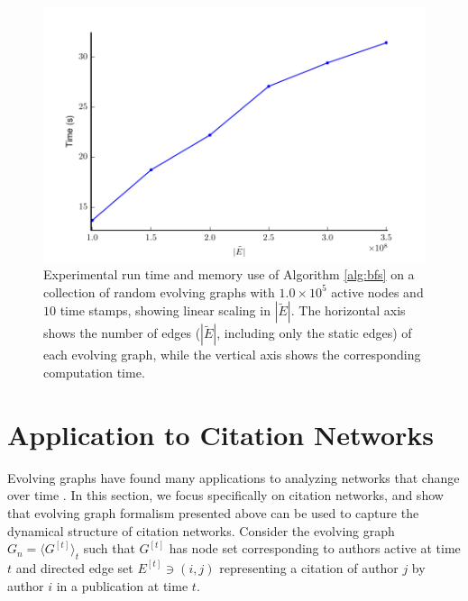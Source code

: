 \documentclass[10pt,conference,compsocconf]{IEEEtran}
\theoremstyle{definition}
\begin{document}
\begin{figure}[h]
  \centering
  \includegraphics[scale=0.58]{time.pdf}
  \caption{Experimental run time and memory use of Algorithm \ref{alg:bfs}
on a collection of random evolving graphs with $1.0\times 10^5$ active nodes and $10$ time
stamps, showing linear scaling in $|\tilde E|$. The horizontal axis shows the
number of edges ($|\tilde E|$, including only the static edges) of each evolving
graph, while the vertical axis shows the corresponding
computation time.}
  \label{fig:time}
\end{figure}

\section{Application to Citation Networks}
\label{sec:applications}

Evolving graphs have found many applications to analyzing networks that change
over time \cite{gphe11,grihig13}. In this section, we focus specifically on
citation networks, and show that evolving graph formalism presented above can be
used to capture the dynamical structure of citation networks. Consider
the evolving graph $G_n=\langle G^{[t]} \rangle_t$ such that $G^{[t]}$ has
node set corresponding to authors active at time $t$ and directed edge set
$E^{[t]} \ni (i, j)$ representing a citation of author $j$ by author $i$ in a
publication at time $t$.
\end{document}
